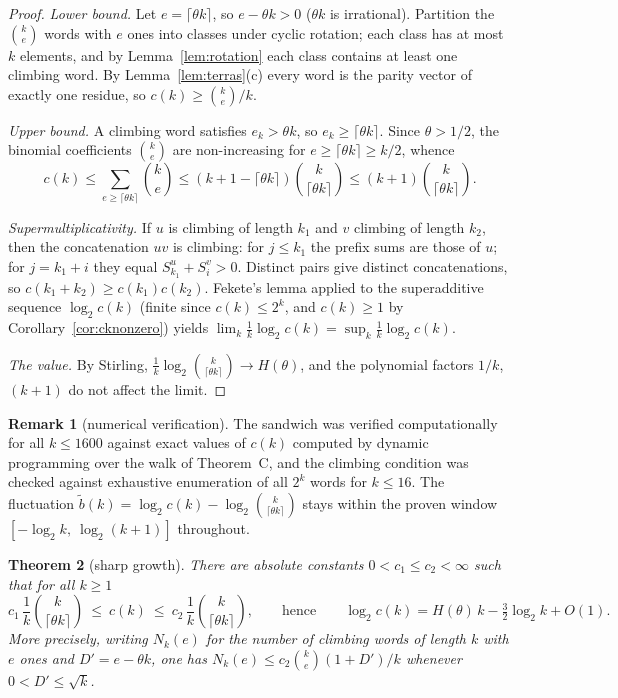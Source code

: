 \documentclass[11pt]{article}
\newtheorem{theorem}{Theorem}[section]
\theoremstyle{definition}
\newtheorem{remark}[theorem]{Remark}
\newcommand{\ceil}[1]{\lceil #1\rceil}
\begin{document}
\begin{proof}
\emph{Lower bound.} Let $e=\ceil{\theta k}$, so $e-\theta k>0$ ($\theta k$
is irrational). Partition the $\binom{k}{e}$ words with $e$ ones into
classes under cyclic rotation; each class has at most $k$ elements, and by
Lemma~\ref{lem:rotation} each class contains at least one climbing word.
By Lemma~\ref{lem:terras}(c) every word is the parity vector of exactly one
residue, so $c(k)\ge \binom{k}{e}/k$.

\emph{Upper bound.} A climbing word satisfies $e_k>\theta k$, so
$e_k\ge\ceil{\theta k}$. Since $\theta>1/2$, the binomial coefficients
$\binom{k}{e}$ are non-increasing for $e\ge\ceil{\theta k}\ge k/2$, whence
\[
c(k)\le \sum_{e\ge \ceil{\theta k}}\binom{k}{e}
\le (k+1-\ceil{\theta k})\binom{k}{\ceil{\theta k}}\le (k+1)\binom{k}{\ceil{\theta k}}.
\]

\emph{Supermultiplicativity.} If $u$ is climbing of length $k_1$ and $v$
climbing of length $k_2$, then the concatenation $uv$ is climbing: for
$j\le k_1$ the prefix sums are those of $u$; for $j=k_1+i$ they equal
$S^u_{k_1}+S^v_i>0$. Distinct pairs give distinct concatenations, so
$c(k_1+k_2)\ge c(k_1)c(k_2)$. Fekete's lemma applied to the superadditive
sequence $\log_2 c(k)$ (finite since $c(k)\le 2^k$, and $c(k)\ge 1$ by
Corollary~\ref{cor:cknonzero}) yields
$\lim_k \frac1k\log_2 c(k)=\sup_k\frac1k\log_2 c(k)$.

\emph{The value.} By Stirling,
$\frac1k\log_2\binom{k}{\ceil{\theta k}}\to H(\theta)$, and the polynomial
factors $1/k$, $(k+1)$ do not affect the limit.
\end{proof}

\begin{remark}[numerical verification]\label{rem:numB}
The sandwich was verified computationally for all $k\le 1600$ against exact
values of $c(k)$ computed by dynamic programming over the walk of
Theorem~C, and the climbing condition was checked against exhaustive
enumeration of all $2^k$ words for $k\le 16$. The fluctuation
$\tilde b(k)=\log_2 c(k)-\log_2\binom{k}{\ceil{\theta k}}$ stays within the
proven window $[-\log_2 k,\ \log_2(k+1)]$ throughout.
\end{remark}

\begin{theorem}[sharp growth]\label{thm:Bsharp}
There are absolute constants $0<c_1\le c_2<\infty$ such that for all
$k\ge 1$
\[
c_1\,\frac1k\binom{k}{\ceil{\theta k}}\ \le\ c(k)\ \le\
c_2\,\frac1k\binom{k}{\ceil{\theta k}},
\qquad\text{hence}\qquad
\log_2 c(k)=H(\theta)\,k-\tfrac32\log_2 k+O(1).
\]
More precisely, writing $N_k(e)$ for the number of climbing words of
length $k$ with $e$ ones and $D'=e-\theta k$, one has
$N_k(e)\le c_2\binom{k}{e}(1+D')/k$ whenever $0<D'\le\sqrt k$.
\end{theorem}
\end{document}
